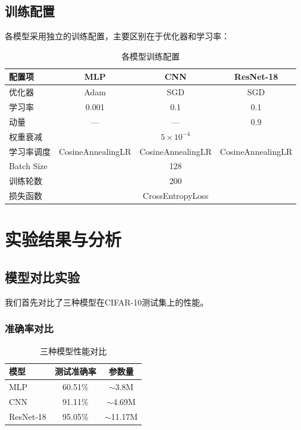 \documentclass[12pt,a4paper]{article}
\begin{document}
\subsection{训练配置}

各模型采用独立的训练配置，主要区别在于优化器和学习率：

\begin{table}[H]
    \centering
    \caption{各模型训练配置}
    \label{tab:training_config}
    \begin{tabular}{lccc}
        \toprule
        \textbf{配置项} & \textbf{MLP} & \textbf{CNN} & \textbf{ResNet-18} \\
        \midrule
        优化器 & Adam & SGD & SGD \\
        学习率 & 0.001 & 0.1 & 0.1 \\
        动量 & --- & --- & 0.9 \\
        权重衰减 & \multicolumn{3}{c}{$5 \times 10^{-4}$} \\
        学习率调度 & CosineAnnealingLR & CosineAnnealingLR & CosineAnnealingLR \\
        Batch Size & \multicolumn{3}{c}{128} \\
        训练轮数 & \multicolumn{3}{c}{200} \\
        损失函数 & \multicolumn{3}{c}{CrossEntropyLoss} \\
        \bottomrule
    \end{tabular}
\end{table}

\section{实验结果与分析}

\subsection{模型对比实验}

我们首先对比了三种模型在CIFAR-10测试集上的性能。

\subsubsection{准确率对比}

\begin{table}[H]
    \centering
    \caption{三种模型性能对比}
    \label{tab:model_comparison}
    \begin{tabular}{lcc}
        \toprule
        \textbf{模型} & \textbf{测试准确率} & \textbf{参数量} \\
        \midrule
MLP & 60.51\% & $\sim$3.8M \\
CNN & 91.11\% & $\sim$4.69M \\
        ResNet-18 & 95.05\% & $\sim$11.17M \\
        \bottomrule
    \end{tabular}
\end{table}
\end{document}
